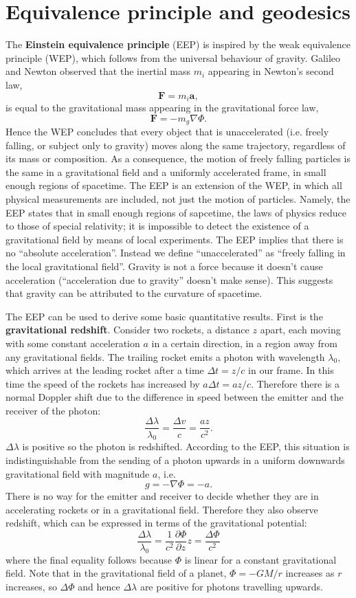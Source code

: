 \documentclass[11pt]{article}
\begin{document}
\section{Equivalence principle and geodesics}

The \textbf{Einstein equivalence principle} (EEP) is inspired by the weak equivalence principle (WEP), which follows from the universal behaviour of gravity.
Galileo and Newton observed that the inertial mass $m_i$ appearing in Newton's second law,
$$ \boldsymbol{F} = m_i \boldsymbol{a}, $$
is equal to the gravitational mass appearing in the gravitational force law,
$$ \boldsymbol{F} = -m_g \nabla \Phi. $$
Hence the WEP concludes that every object that is unaccelerated (i.e. freely falling, or subject only to gravity) moves along the same trajectory, regardless of its mass or composition. 
As a consequence, the motion of freely falling particles is the same in a gravitational field and a uniformly accelerated frame, in small enough regions of spacetime.
The EEP is an extension of the WEP, in which all physical measurements are included, not just the motion of particles.
Namely, the EEP states that in small enough regions of sapcetime, the laws of physics reduce to those of special relativity; it is impossible to detect the existence of a gravitational field by means of local experiments.
The EEP implies that there is no ``absolute acceleration''.
Instead we define ``unaccelerated'' as ``freely falling in the local gravitational field''.
Gravity is not a force because it doesn't cause acceleration (``acceleration due to gravity'' doesn't make sense).
This suggests that gravity can be attributed to the curvature of spacetime.

The EEP can be used to derive some basic quantitative results.
First is the \textbf{gravitational redshift}.
Consider two rockets, a distance $z$ apart, each moving with some constant acceleration $a$ in a certain direction, in a region away from any gravitational fields.
The trailing rocket emits a photon with wavelength $\lambda_0$, which arrives at the leading rocket after a time $\Delta t = z/c$ in our frame.
In this time the speed of the rockets has increased by $a \Delta t = az/c$.
Therefore there is a normal Doppler shift due to the difference in speed between the emitter and the receiver of the photon:
$$\frac{\Delta \lambda}{\lambda_0} = \frac{\Delta v}{c} =\frac{az}{c^2}.$$
$\Delta \lambda$ is positive so the photon is redshifted.
According to the EEP, this situation is indistinguishable from the sending of a photon upwards in a uniform downwards gravitational field with magnitude $a$, i.e.
$$ g = -\nabla \Phi = -a .$$
There is no way for the emitter and receiver to decide whether they are in accelerating rockets or in a gravitational field.
Therefore they also observe redshift, which can be expressed in terms of the gravitational potential:
$$ \frac{\Delta \lambda}{\lambda_0} = \frac{1}{c^2} \frac{\partial \Phi}{\partial z} z = \frac{\Delta \Phi}{c^2} $$
where the final equality follows because $\Phi$ is linear for a constant gravitational field.
Note that in the gravitational field of a planet, $\Phi = -G M/r$ increases as $r$ increases, so $\Delta \Phi$ and hence $\Delta \lambda$ are positive for photons travelling upwards.
\end{document}

